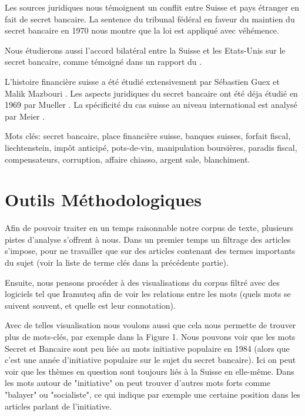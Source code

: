 \documentclass[11pt]{article}
\begin{document}
Les sources juridiques nous témoignent un conflit entre Suisse et pays
étranger en fait de secret bancaire. La sentence du tribunal fédéral
\citep{tribunalFederal70} en faveur du maintien du secret bancaire
en 1970 nous montre que la loi est appliqué avec véhémence.

Nous étudierons aussi l'accord bilatéral entre la Suisse et les Etats-Unis sur
le secret bancaire, comme témoigné dans un rapport du \citet{insiderTrading83}.

L’histoire financière suisse a été étudié extensivement par Sébastien Guex et
Malik Mazbouri \citep{Guex99} \citep{Guex00} \citep{Mazbouri12}.
Les aspects juridiques du secret bancaire ont été déja étudié en 1969
par Mueller \citep{Mueller69}.
La spécificité du cas suisse au niveau international est analysé par
Meier \citep{Meier12}.

Mots clés: secret bancaire, place financière suisse, banques suisses, forfait
fiscal, liechtenstein, impôt anticipé, pots-de-vin, manipulation boursières,
paradis fiscal, compensateurs, corruption, affaire chiasso, argent sale,
blanchiment.

\section{Outils Méthodologiques}

Afin de pouvoir traiter en un temps raisonnable notre corpus de texte, plusieurs
pistes d’analyse s’offrent à nous. Dans un premier temps un filtrage des
articles s’impose, pour ne travailler que sur des articles contenant des termes
importants du sujet (voir la liste de terme clés dans la précédente partie).

Ensuite, nous pensons procéder à des visualisations du corpus filtré avec des
logiciels tel que Iramuteq afin de voir les relations entre les mots (quels mots
se suivent souvent, et quelle est leur connotation).

Avec de telles visualisation nous voulons aussi que cela nous permette de
trouver plus de mots-clés, par exemple dans la Figure 1. Nous pouvons voir que
les mots Secret et Bancaire sont peu liée au mots initiative populaire en 1984
(alors que c'est une année d'initiative populaire sur le sujet du secret
bancaire). Ici on peut voir que les thèmes en question sont toujours liés à la
Suisse en elle-même. Dans les mots autour de "initiative" on peut trouver
d'autres mots forts comme "balayer" ou "socialiste", ce qui indique par exemple
une certaine position dans les articles parlant de l'initiative.
\end{document}
